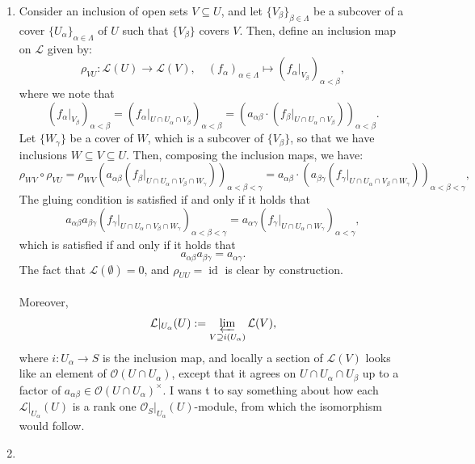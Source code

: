 \documentclass[a4paper]{report}
\theoremstyle{definition}
\theoremstyle{remark}
\theoremstyle{proposition}
\theoremstyle{conjecture}
\theoremstyle{lemma}
\theoremstyle{corollary}
\theoremstyle{exercise}
\theoremstyle{example}
\newcommand{\mcal}{\mathcal}
\newcommand{\on}{\operatorname}
\begin{document}
\begin{enumerate}
    \item Consider an inclusion of open sets $V\subseteq U$, and 
        let $\lbrace V_\beta\rbrace_{\beta \in \Lambda}$ be a subcover 
        of a cover $\lbrace U_\alpha\rbrace_{\alpha \in \Lambda}$ of $U$
        such that $\lbrace V_\beta\rbrace$ covers $V$.
        Then, define an inclusion map on $\mcal{L}$ given by:
        $$\rho_{VU} : \mcal{L}(U) \longrightarrow \mcal{L}(V),\quad (f_\alpha)_{\alpha\in \Lambda} \longmapsto (f_\alpha\vert_{V_\beta})_{\alpha < \beta},$$
        where we note that 
        $$(f_\alpha\vert_{V_\beta})_{\alpha<\beta} = (f_\alpha\vert_{U\cap U_\alpha \cap V_\beta})_{\alpha < \beta} = (a_{\alpha\beta} \cdot (f_\beta\vert_{U \cap U_\alpha \cap V_\beta}))_{\alpha < \beta}.$$
        Let $\lbrace W_\gamma\rbrace$  be a cover of $W$, which is a subcover 
        of $\lbrace V_\beta\rbrace$, so that we have inclusions 
        $W\subseteq V \subseteq U$.
        Then, composing the inclusion maps, we have:
        $$\rho_{WV} \circ \rho_{VU} = \rho_{WV} (a_{\alpha\beta} (f_\beta\vert_{U\cap U_\alpha \cap V_\beta \cap W_\gamma}))_{\alpha < \beta < \gamma} = a_{\alpha\beta} \cdot (a_{\beta\gamma} (f_\gamma\vert_{U \cap U_\alpha \cap V_\beta \cap W_\gamma}))_{\alpha<\beta<\gamma},$$
        The gluing condition is satisfied if and only if it holds that
        $$a_{\alpha\beta}a_{\beta\gamma} (f_\gamma\vert_{U\cap U_\alpha \cap V_\beta \cap W_\gamma})_{\alpha < \beta < \gamma} = a_{\alpha\gamma} (f_\gamma\vert_{U\cap U_\alpha \cap W_\gamma})_{\alpha < \gamma},$$
        which is satisfied if and only if it holds that 
        $$a_{\alpha\beta}a_{\beta\gamma} = a_{\alpha\gamma}.$$
        The fact that $\mcal{L}(\emptyset) = 0$, and $\rho_{UU} = \on{id}$ 
        is clear by construction.\\\\
        Moreover, $$\mcal{L}\vert_{U_\alpha} (U) := \varprojlim_{V\supseteq i(U_\alpha)}\mcal{L}(V),$$
        where $i : U_\alpha \to S$ is the inclusion map, and 
        locally a section of $\mcal{L}(V)$ looks like an element of 
        $\mcal{O}(U\cap U_\alpha)$, except that it agrees on 
        $U\cap U_\alpha\cap U_\beta$ up to a factor of $a_{\alpha\beta} \in \mcal{O}(U\cap U_\alpha)^\times$. I wans t to say something about how each 
        $\mcal{L}\vert_{U_\alpha}(U)$ is a rank one $\mcal{O}_S\vert_{U_\alpha}(U)$-module, from which the isomorphism would follow.
    \item 
        \begin{itemize}

\end{itemize}
\end{enumerate}
\end{document}
